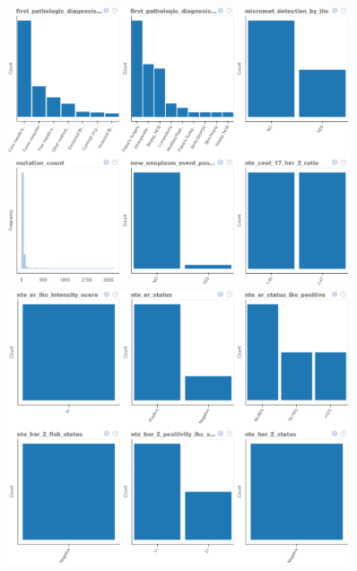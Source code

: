 \begin{figure}
	\includegraphics[width=0.9\textwidth]{NOTEBOOK/IMAGES_EDA/11}
	\includegraphics[width=0.9\textwidth]{NOTEBOOK/IMAGES_EDA/12}
\end{figure}

